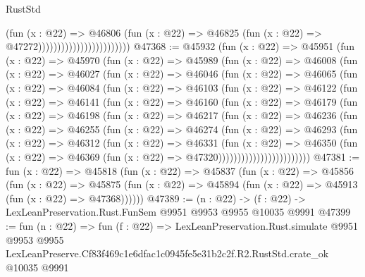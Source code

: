 \begin{lexlean}{RustStd}
\begin{coremodule}
                                              (fun (x : @22) =>
                                              @46806
                                                (fun (x : @22) =>
                                                @46825
                                                  (fun (x : @22) => @47272))))))))))))))))))))))))
@47368 := @45932
    (fun (x : @22) =>
    @45951
      (fun (x : @22) =>
      @45970
        (fun (x : @22) =>
        @45989
          (fun (x : @22) =>
          @46008
            (fun (x : @22) =>
            @46027
              (fun (x : @22) =>
              @46046
                (fun (x : @22) =>
                @46065
                  (fun (x : @22) =>
                  @46084
                    (fun (x : @22) =>
                    @46103
                      (fun (x : @22) =>
                      @46122
                        (fun (x : @22) =>
                        @46141
                          (fun (x : @22) =>
                          @46160
                            (fun (x : @22) =>
                            @46179
                              (fun (x : @22) =>
                              @46198
                                (fun (x : @22) =>
                                @46217
                                  (fun (x : @22) =>
                                  @46236
                                    (fun (x : @22) =>
                                    @46255
                                      (fun (x : @22) =>
                                      @46274
                                        (fun (x : @22) =>
                                        @46293
                                          (fun (x : @22) =>
                                          @46312
                                            (fun (x : @22) =>
                                            @46331
                                              (fun (x : @22) =>
                                              @46350
                                                (fun (x : @22) =>
                                                @46369
                                                  (fun (x : @22) => @47320))))))))))))))))))))))))
@47381 := fun (x : @22) =>
  @45818
    (fun (x : @22) =>
    @45837
      (fun (x : @22) =>
      @45856
        (fun (x : @22) =>
        @45875 (fun (x : @22) => @45894 (fun (x : @22) => @45913 (fun (x : @22) => @47368))))))
@47389 := (n : @22) -> (f : @22) -> LexLeanPreservation.Rust.FunSem @9951 @9953 @9955 @10035 @9991
@47399 := fun (n : @22) =>
  fun (f : @22) =>
  LexLeanPreservation.Rust.simulate
    @9951
    @9953
    @9955
    LexLeanPreserve.Cf83f469c1e6dfac1c0945fe5e31b2c2f.R2.RustStd.crate_ok
    @10035
    @9991
\end{coremodule}
\end{lexlean}
